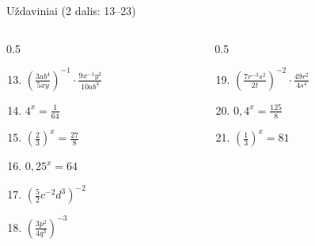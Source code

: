 \documentclass[aspectratio=169,10pt]{beamer}
\begin{document}
\begin{frame}{Uždaviniai (2 dalis: 13--23)}

    \begin{columns}[T]

        \begin{column}{0.5\textwidth}

            \begin{enumerate}

                \setcounter{enumi}{12}

                \item
                $\left(
                \frac{3ab^4}{5xy}
                \right)^{-1}
                \cdot
                \frac{9x^{-1}y^2}{10ab^4}$

                \item
                $4^x=\frac{1}{64}$

                \item
                $\left(
                \frac23
                \right)^x
                =
                \frac{27}{8}$

                \item
                $0{,}25^x=64$

                \item
                $\left(
                \frac52c^{-2}d^3
                \right)^{-2}$

                \item
                $\left(
                \frac{3p^2}{4q^3}
                \right)^{-3}$

            \end{enumerate}

        \end{column}

        \begin{column}{0.5\textwidth}

            \begin{enumerate}

                \setcounter{enumi}{18}

                \item
                $\left(
                \frac{7r^{-3}s^2}{2t}
                \right)^{-2}
                \cdot
                \frac{49r^2}{4s^4}$

                \item
                $0{,}4^x=\frac{125}{8}$

                \item
                $\left(
                \frac13
                \right)^x
                =
                81$


\end{enumerate}
\end{column}
\end{columns}
\end{frame}
\end{document}
